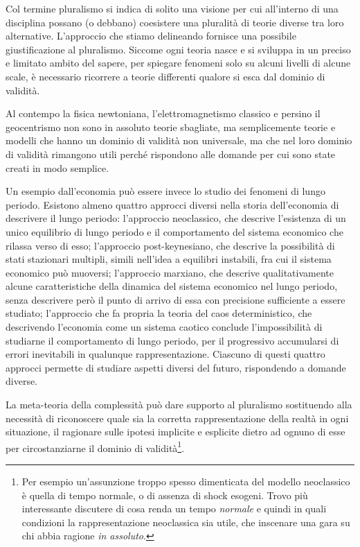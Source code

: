 \documentclass[a4paper, headings=standardclasses]{scrartcl}
\begin{document}
Col termine pluralismo si indica di solito una visione per cui all'interno di una disciplina possano (o debbano) coesistere una pluralità di teorie diverse tra loro alternative.
L'approccio che stiamo delineando fornisce una possibile giustificazione al pluralismo.
Siccome ogni teoria nasce e si sviluppa in un preciso e limitato ambito del sapere, per spiegare fenomeni solo su alcuni livelli di alcune scale, è necessario ricorrere a teorie differenti qualore si esca dal dominio di validità.

Al contempo la fisica newtoniana, l'elettromagnetismo classico e persino il geocentrismo non sono in assoluto teorie sbagliate, ma semplicemente teorie e modelli che hanno un dominio di validità non universale, ma che nel loro dominio di validità rimangono utili perché rispondono alle domande per cui sono state creati in modo semplice.

Un esempio dall'economia può essere invece lo studio dei fenomeni di lungo periodo.
Esistono almeno quattro approcci diversi nella storia dell'economia di descrivere il lungo periodo: l'approccio neoclassico, che descrive l'esistenza di un unico equilibrio di lungo periodo e il comportamento del sistema economico che rilassa verso di esso; l'approccio post-keynesiano, che descrive la possibilità di stati stazionari multipli, simili nell'idea a equilibri instabili, fra cui il sistema economico può muoversi; l'approccio marxiano, che descrive qualitativamente alcune caratteristiche della dinamica del sistema economico nel lungo periodo, senza descrivere però il punto di arrivo di essa con precisione sufficiente a essere studiato; l'approccio che fa propria la teoria del caos deterministico, che descrivendo l'economia come un sistema caotico conclude l'impossibilità di studiarne il comportamento di lungo periodo, per il progressivo accumularsi di errori inevitabili in qualunque rappresentazione.
Ciascuno di questi quattro approcci permette di studiare aspetti diversi del futuro, rispondendo a domande diverse.

La meta-teoria della complessità può dare supporto al pluralismo sostituendo alla necessità di riconoscere quale sia la corretta rappresentazione della realtà in ogni situazione, il ragionare sulle ipotesi implicite e esplicite dietro ad ognuno di esse per circostanziarne il dominio di validità\footnote{Per esempio un'assunzione troppo spesso dimenticata del modello neoclassico è quella di tempo normale, o di assenza di shock esogeni. Trovo più interessante discutere di cosa renda un tempo \textit{normale} e quindi in quali condizioni la rappresentazione neoclassica sia utile, che inscenare una gara su chi abbia ragione \textit{in assoluto}.}.
\end{document}
